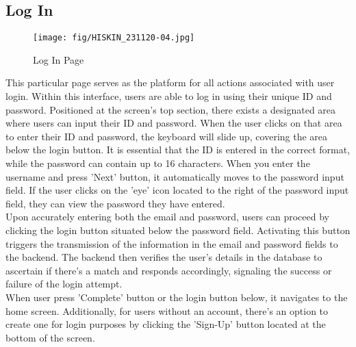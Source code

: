 \documentclass[conference]{IEEEtran}
\begin{document}
\subsection{Log In}
    \begin{figure}[h]
    \centering
    \texttt{[image: fig/HISKIN\_231120-04.jpg]}
    \label{fig:Log In Page}
    \caption{Log In Page} 
    \end{figure}
This particular page serves as the platform for all actions associated with user login. Within this interface, users are able to log in using their unique ID and password. Positioned at the screen's top section, there exists a designated area where users can input their ID and password. When the user clicks on that area to enter their ID and password, the keyboard will slide up, covering the area below the login button. It is essential that the ID is entered in the correct format, while the password can contain up to 16 characters. When you enter the username and press 'Next' button, it automatically moves to the password input field. If the user clicks on the 'eye' icon located to the right of the password input field, they can view the password they have entered. \\  Upon accurately entering both the email and password, users can proceed by clicking the login button situated below the password field. Activating this button triggers the transmission of the information in the email and password fields to the backend. The backend then verifies the user's details in the database to ascertain if there's a match and responds accordingly, signaling the success or failure of the login attempt.\\ When user press 'Complete' button or the login button below, it navigates to the home screen. Additionally, for users without an account, there's an option to create one for login purposes by clicking the 'Sign-Up' button located at the bottom of the screen. \\ \\ \\ \\ \\
\end{document}
